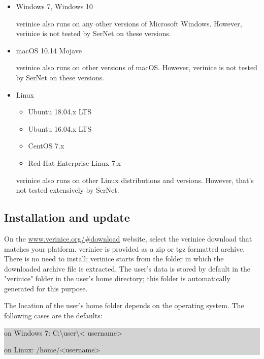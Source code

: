 \documentclass[a4paper,10pt]{book}
\begin{document}
\begin{itemize}
  \item Windows 7, Windows 10

    verinice also runs on any other versions of Microsoft Windows. However, verinice
    is not tested by SerNet on these versions.

  \item macOS 10.14 Mojave

    verinice also runs on other versions of macOS. However, verinice is not tested
    by SerNet on these versions.

  \item Linux
    \begin{itemize}
      \item Ubuntu 18.04.x LTS
      \item Ubuntu 16.04.x LTS
      \item CentOS 7.x
      \item Red Hat Enterprise Linux 7.x
    \end{itemize}

    verinice also runs on other Linux distributions and versions.
    However, that's not tested extensively by SerNet.
\end{itemize}

\subsection{Installation and update}
\label{sec:installation} %
On the \href{https://verinice.org/\#download}{www.verinice.org/\#download}
website, select the verinice download that matches your platform. verinice is
provided as a zip or tgz formatted archive. There is no need to install;
verinice starts from the folder in which the downloaded archive file is
extracted. The user's data is stored by default in the "verinice" folder in
the user's home directory; this folder is automatically generated for this
purpose.

The location of the user's home folder depends on the operating system. The
following cases are the defaults:

\colorbox{lightgray}{\parbox{\textwidth}{
\begin{itemize}
  {\em
    \item on Windows 7: C:\textbackslash user\textbackslash\textless
      username\textgreater
    \item on Linux: /home/\textless username\textgreater
  }
\end{itemize}
}}
\end{document}
